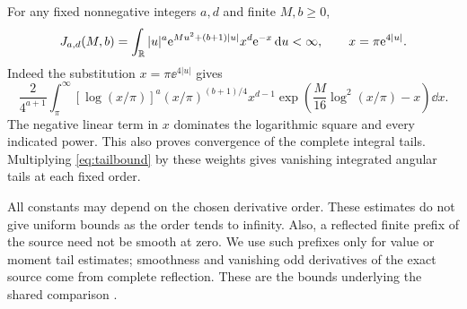 For any fixed nonnegative integers $a,d$ and finite $M,b\ge0$,
\begin{equation}\label{eq:J}
 J_{a,d}(M,b)=\int_\mathbb R |u|^a
 \mathrm e^{Mu^2+(b+1)|u|}x^d\mathrm e^{-x}\,\mathrm d u<\infty,
 \qquad x=\pi\mathrm e^{4|u|}.
\end{equation}
Indeed the substitution $x=\pi\ee^{4|u|}$ gives
\[
 \frac{2}{4^{a+1}}\int_\pi^\infty
 [\log(x/\pi)]^a(x/\pi)^{(b+1)/4}x^{d-1}
 \exp\!\left(\frac M{16}\log^2(x/\pi)-x\right)\dd x.
\]
The negative linear term in $x$ dominates the logarithmic square and
every indicated power. This also proves convergence of the complete
integral tails. Multiplying \eqref{eq:tailbound} by these weights gives
vanishing integrated angular tails at each fixed order.

All constants may depend on the chosen derivative order. These estimates
do not give uniform bounds as the order tends to infinity. Also, a
reflected finite prefix of the source need not be smooth at zero. We use
such prefixes only for value or moment tail estimates; smoothness and
vanishing odd derivatives of the exact source come from complete reflection.
These are the bounds underlying the shared comparison
\cite[Section 6]{TNDParent}.
